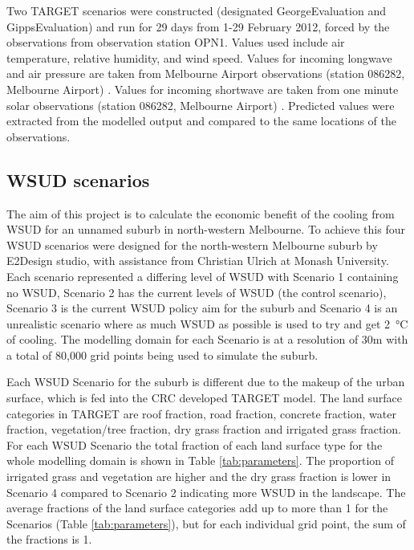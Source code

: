 \documentclass[final,3p,times,authoryear]{elsarticle}
\begin{document}
Two TARGET scenarios were constructed (designated GeorgeEvaluation and GippsEvaluation) and run for 29 days from 1-29 February 2012, forced by the observations from observation station OPN1. Values used include air temperature, relative humidity, and wind speed. Values for incoming longwave and air pressure are taken from Melbourne Airport observations (station 086282, Melbourne Airport) \citep{BOM2016b}. Values for incoming shortwave are taken from one minute solar observations (station 086282, Melbourne Airport) \citep{BOM2016}. Predicted values were extracted from the modelled output and compared to the same locations of the observations.




\subsection{WSUD scenarios}\label{sec:methods_wsudscenarios}
The aim of this project is to calculate the economic benefit of the cooling from WSUD for an unnamed suburb in north-western Melbourne. To achieve this four WSUD scenarios were designed for the north-western Melbourne suburb by E2Design studio, with assistance from Christian Ulrich at Monash University. Each scenario represented a differing level of WSUD with Scenario 1 containing no WSUD, Scenario 2 has the current levels of WSUD (the control scenario), Scenario 3 is the current WSUD policy aim for the suburb and Scenario 4 is an unrealistic scenario where as much WSUD as possible is used to try and get 2\SI{}{\degreeCelsius} of cooling. The modelling domain for each Scenario is at a resolution of 30m with a total of 80,000 grid points being used to simulate the suburb.

Each WSUD Scenario for the suburb is different due to the makeup of the urban surface, which is fed into the CRC developed TARGET model. The land surface categories in TARGET are roof fraction, road fraction, concrete fraction, water fraction, vegetation/tree fraction, dry grass fraction and irrigated grass fraction. For each WSUD Scenario the total fraction of each land surface type for the whole modelling domain is shown in Table \ref{tab:parameters}. The proportion of irrigated grass and vegetation are higher and the dry grass fraction is lower in Scenario 4 compared to Scenario 2 indicating more WSUD in the landscape. The average fractions of the land surface categories add up to more than 1 for the Scenarios (Table \ref{tab:parameters}), but for each individual grid point, the sum of the fractions is 1.
\end{document}
